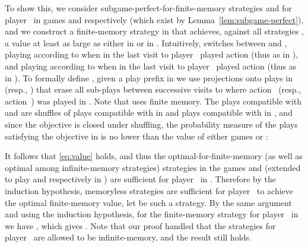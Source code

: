 \documentclass{article}
\begin{document}
To show this, we consider subgame-perfect-for-finite-memory strategies  and  
for player~ in games  and  respectively (which exist by Lemma~\ref{lem:subgame-perfect}), 
and we construct
a finite-memory strategy  in  that achieves, against all strategies 
, a value at least as large as either  in  or  
in . Intuitively,  switches between  and , 
playing according to  when in the last visit to  player~ 
played action  (thus as in ),
and playing according to  when in the last visit to  player~ 
played action  (thus as in ). 
To formally define , given a play prefix in  we use projections 
onto plays in  (resp., ) that erase all sub-plays between
successive visits to  where action~ (resp., action~) was played in .
Note that  uses finite memory.
The plays compatible with  and  are shuffles of plays compatible 
with  in  and plays compatible with  in ,
and since the objective  is closed under shuffling, the probability
measure of the plays satisfying the objective in  is no lower than
the value of either games  or :

It follows that \eqref{eq:value} holds, and thus the optimal-for-finite-memory (as well as optimal among 
infinite-memory strategies) strategies 
in the games  and  (extended to play  and  respectively in ) are sufficient
for player~ in . Therefore by the induction hypothesis, memoryless strategies
are sufficient for player~ to achieve the optimal finite-memory value, let 
 be such a strategy.
By the same argument and using the induction hypothesis, for the
finite-memory strategy  for player~ in  we have 
, 
which gives .
Note that our proof handled that the strategies for player~ are allowed to be 
infinite-memory, and the result still holds.
\end{document}

